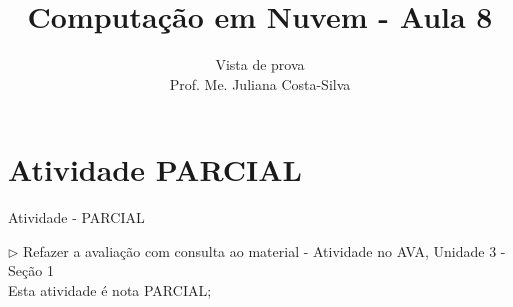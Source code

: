 \documentclass{beamer}
\title{Computação em Nuvem - Aula 8}
\subtitle{Vista de prova\\
Prof. Me. Juliana Costa-Silva}
\begin{document}
\frame{
 \titlepage
}

\section{Atividade PARCIAL}
\begin{frame}{Atividade - PARCIAL}
    

     $\rhd$ Refazer a avaliação com consulta ao material - Atividade no AVA, Unidade 3 - Seção 1\\
Esta atividade é nota PARCIAL;
    
\end{frame}

\end{document}
